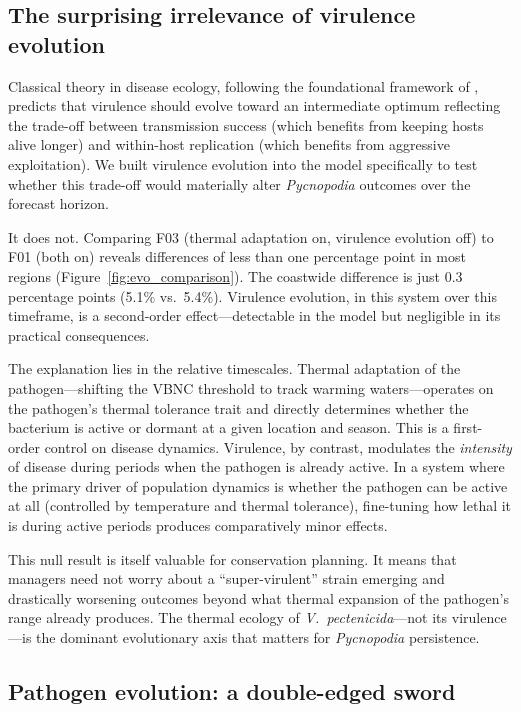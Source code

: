 \subsection{The surprising irrelevance of virulence evolution}
\label{sec:findings_virulence}

Classical theory in disease ecology, following the foundational framework of
\citet{anderson1982}, predicts that virulence should evolve toward an
intermediate optimum reflecting the trade-off between transmission success
(which benefits from keeping hosts alive longer) and within-host replication
(which benefits from aggressive exploitation). We built virulence evolution
into the model specifically to test whether this trade-off would materially
alter \textit{Pycnopodia} outcomes over the forecast horizon.

It does not. Comparing F03 (thermal adaptation on, virulence evolution off)
to F01 (both on) reveals differences of less than one percentage point in
most regions (Figure~\ref{fig:evo_comparison}). The coastwide difference is
just 0.3 percentage points (5.1\% vs.\ 5.4\%). Virulence evolution, in this
system over this timeframe, is a second-order effect---detectable in the model
but negligible in its practical consequences.

The explanation lies in the relative timescales. Thermal adaptation of the
pathogen---shifting the VBNC threshold to track warming waters---operates on
the pathogen's thermal tolerance trait and directly determines whether the
bacterium is active or dormant at a given location and season. This is a
first-order control on disease dynamics. Virulence, by contrast, modulates
the \textit{intensity} of disease during periods when the pathogen is already
active. In a system where the primary driver of population dynamics is whether
the pathogen can be active at all (controlled by temperature and thermal
tolerance), fine-tuning how lethal it is during active periods produces
comparatively minor effects.

This null result is itself valuable for conservation planning. It means that
managers need not worry about a ``super-virulent'' strain emerging and
drastically worsening outcomes beyond what thermal expansion of the pathogen's
range already produces. The thermal ecology of \textit{V.\ pectenicida}---not
its virulence---is the dominant evolutionary axis that matters for
\textit{Pycnopodia} persistence.

\subsection{Pathogen evolution: a double-edged sword}
\label{sec:findings_evo_paradox}


